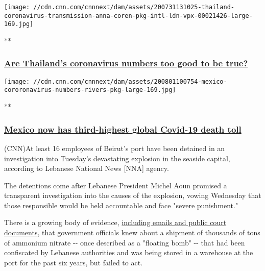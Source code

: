 \href{/videos/world/2020/07/31/thailand-coronavirus-transmission-anna-coren-pkg-intl-ldn-vpx.cnn/video/playlists/around-the-world/}{}

\texttt{[image: //cdn.cnn.com/cnnnext/dam/assets/200731131025-thailand-coronavirus-transmission-anna-coren-pkg-intl-ldn-vpx-00021426-large-169.jpg]}

**

\hypertarget{are-thailands-coronavirus-numbers-too-good-to-be-true-}{%
\subsubsection{\texorpdfstring{\href{/videos/world/2020/07/31/thailand-coronavirus-transmission-anna-coren-pkg-intl-ldn-vpx.cnn/video/playlists/around-the-world/}{Are
Thailand's coronavirus numbers too good to be true?
}}{Are Thailand's coronavirus numbers too good to be true? }}\label{are-thailands-coronavirus-numbers-too-good-to-be-true-}}

\href{/videos/world/2020/08/01/mexico-coronavirus-death-toll-rivers-pkg-vpx.cnn/video/playlists/around-the-world/}{}

\texttt{[image: //cdn.cnn.com/cnnnext/dam/assets/200801100754-mexico-cororonavirus-numbers-rivers-pkg-large-169.jpg]}

**

\hypertarget{mexico-now-has-third-highest-global-covid-19-death-toll}{%
\subsubsection{\texorpdfstring{\href{/videos/world/2020/08/01/mexico-coronavirus-death-toll-rivers-pkg-vpx.cnn/video/playlists/around-the-world/}{Mexico
now has third-highest global Covid-19 death
toll}}{Mexico now has third-highest global Covid-19 death toll}}\label{mexico-now-has-third-highest-global-covid-19-death-toll}}

(CNN)At least 16 employees of Beirut's port have been detained in an
investigation into Tuesday's devastating explosion in the seaside
capital, according to Lebanese National News {[}NNA{]} agency.

The detentions come after Lebanese President Michel Aoun promised a
transparent investigation into the causes of the explosion, vowing
Wednesday that those responsible would be held accountable and face
"severe punishment."

There is a growing body of evidence,
\href{https://edition.cnn.com/2020/08/05/europe/lebanon-russian-ship-blast-intl/index.html}{including
emails and public court documents}, that government officials knew about
a shipment of thousands of tons of ammonium nitrate -\/- once described
as a "floating bomb" -\/- that had been confiscated by Lebanese
authorities and was being stored in a warehouse at the port for the past
six years, but failed to act.

